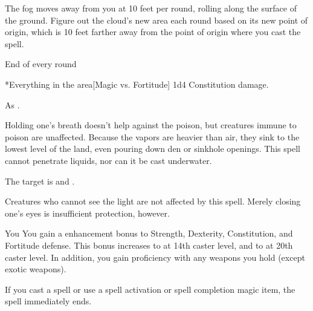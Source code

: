 \par The fog moves away from you at 10 feet per round, rolling along the surface of the ground. Figure out the cloud's new area each round based on its new point of origin, which is 10 feet farther away from the point of origin where you cast the spell.
\begin{spelltrigger}{End of every round}
    \begin{spelltargets}*{Everything in the area}[Magic vs. Fortitude]
        \spellsuccess 1d4 Constitution damage.
    \end{spelltargets}
\end{spelltrigger}
\spellnotes As .

Holding one's breath doesn't help against the poison, but creatures immune to poison are unaffected. Because the vapors are heavier than air, they sink to the lowest level of the land, even pouring down den or sinkhole openings. This spell cannot penetrate liquids, nor can it be cast underwater.

\begin{spelltargets}
    \spellsuccess The target is \dazzled and \bewildered.
\end{spelltargets}
\spellnotes Creatures who cannot see the light are not affected by this spell. Merely closing one's eyes is insufficient protection, however.

\spellrng{\rngpers}
\spelldur{\durshort \dismissable}
\begin{spelltarget}{You}
    \spelleffect You gain a  enhancement bonus to Strength, Dexterity, Constitution, and Fortitude defense. This bonus increases to  at 14th caster level, and to  at 20th caster level. In addition, you gain proficiency with any weapons you hold (except exotic weapons).
\end{spelltarget}
\spellnotes If you cast a spell or use a spell activation or spell completion magic item, the spell immediately ends.

